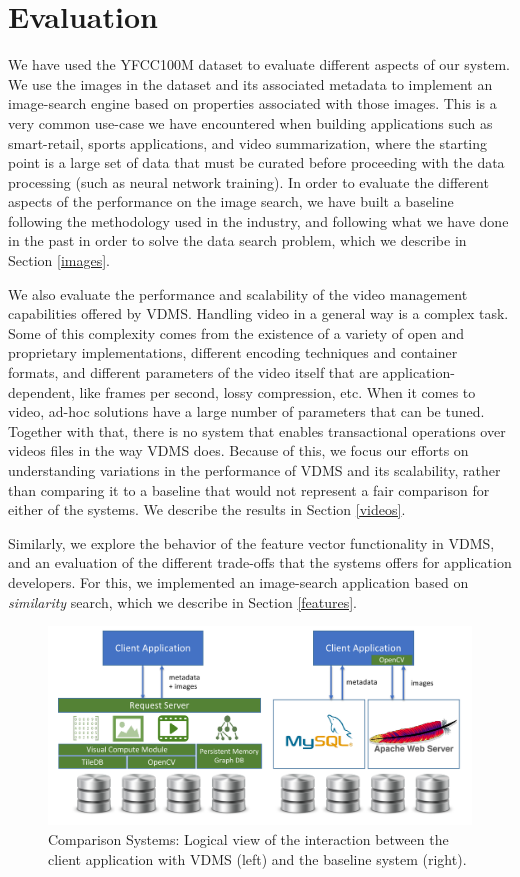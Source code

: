 \section{Evaluation}
\label{eval}

We have used the YFCC100M dataset to evaluate different aspects of our system.
We use the images in the dataset and its associated metadata to implement
an image-search engine based on properties associated with those images.
This is a very common use-case we have encountered when building
applications such as smart-retail, sports applications, and video summarization,
where the starting point is a large set of data that must be curated
before proceeding with the data processing (such as neural network training).
In order to evaluate the different aspects of the performance on the
image search, we have built a baseline following the methodology
used in the industry, and following what we have done in the past
in order to solve the data search problem,
which we describe in Section \ref{images}.

We also evaluate the performance and scalability of the video management
capabilities offered by VDMS.
Handling video in a general way is a complex task.
Some of this complexity comes from the existence of a variety of open and
proprietary implementations, different encoding techniques and container
formats, and different parameters of the video itself that are
application-dependent, like frames per second, lossy compression, etc.
When it comes to video, ad-hoc solutions have a large number of parameters that
can be tuned.
Together with that, there is no system that enables transactional
operations over videos files in the way VDMS does.
Because of this, we focus our efforts on understanding variations in the
performance of VDMS and its scalability, rather than comparing
it to a baseline that would not represent a fair
comparison for either of the systems.
We describe the results in Section \ref{videos}.

Similarly, we explore the behavior of the feature vector functionality in VDMS,
and an evaluation of the different trade-offs that the systems offers for
application developers. For this, we implemented an image-search application
based on \textit{similarity} search, which we describe in Section \ref{features}.


\begin{figure}
\centering
\includegraphics[width=\textwidth]{figures/comparison_system}
\caption{Comparison Systems: Logical view of the interaction between the client application with VDMS (left) and the baseline system (right).}
\label{fig:systems}
\end{figure}

